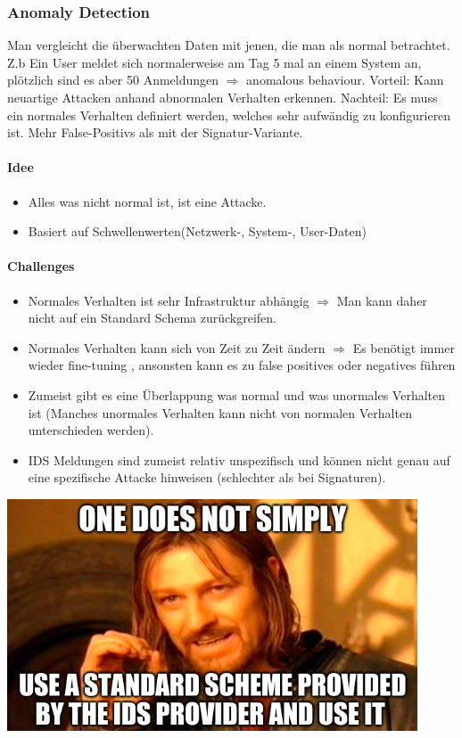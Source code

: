 \subsubsection{Anomaly Detection}
Man vergleicht die überwachten Daten mit jenen, die man als normal betrachtet. Z.b Ein User meldet sich normalerweise am Tag 5 mal an einem System an, plötzlich sind es aber 50 Anmeldungen $\Rightarrow$ anomalous behaviour. Vorteil: Kann neuartige Attacken anhand abnormalen Verhalten erkennen. Nachteil: Es muss ein \glqq normales Verhalten \grqq definiert werden, welches sehr aufwändig zu konfigurieren ist. Mehr False-Positivs als mit der Signatur-Variante.

\paragraph{Idee}
\begin{itemize}
    \item Alles was nicht \grqq normal \glqq ist, ist eine Attacke.
    \item Basiert auf Schwellenwerten(Netzwerk-, System-, User-Daten)
\end{itemize}

\paragraph{Challenges}
\begin{itemize}
    \item Normales Verhalten ist sehr Infrastruktur abhängig $\Rightarrow$ Man kann daher nicht auf ein Standard Schema zurückgreifen. 
    \item Normales Verhalten kann sich von Zeit zu Zeit ändern $\Rightarrow$ Es benötigt immer wieder fine-tuning , ansonsten kann es zu false positives oder negatives führen
    \item Zumeist gibt es eine Überlappung was normal und was unormales Verhalten ist (Manches unormales Verhalten kann nicht von normalen Verhalten unterschieden werden).
    \item IDS Meldungen sind zumeist relativ unspezifisch und können nicht genau auf eine spezifische Attacke hinweisen (schlechter als bei Signaturen).
\end{itemize}
\begin{minipage}[t]{1\textwidth}
    \centering
	\includegraphics[width=0.5\linewidth]{images/one-does-not-simply.png}
\end{minipage}


